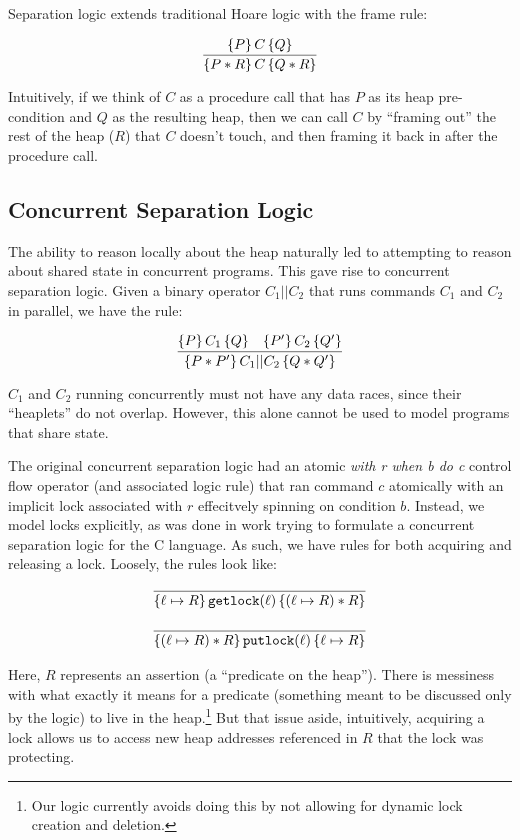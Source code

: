Separation logic extends traditional Hoare logic\cite{hoare1969axiomatic} with
the frame rule:

\[
\infer{\hoaretrip{P * R}{C}{Q * R}}{\hoaretrip{P}{C}{Q}}
\]

Intuitively, if we think of $C$ as a procedure call that has $P$ as its heap
pre-condition and $Q$ as the resulting heap, then we can call $C$ by ``framing
out'' the rest of the heap ($R$) that $C$ doesn't touch, and then framing it
back in after the procedure call.

\subsection{Concurrent Separation Logic}

The ability to reason locally about the heap naturally led to attempting to
reason about shared state in concurrent programs. This gave rise to concurrent
separation logic\cite{o2007resources}. Given a binary operator $C_1 || C_2$ that
runs commands $C_1$ and $C_2$ in parallel, we have the rule:

\[
    \infer{\hoaretrip{P * P'}{C_1 || C_2}{Q * Q'}}{\hoaretrip{P}{C_1}{Q} &
						   \hoaretrip{P'}{C_2}{Q'}}
\]

$C_1$ and $C_2$ running concurrently must not have any data races, since their
``heaplets'' do not overlap. However, this alone cannot be used to model
programs that share state.

The original concurrent separation logic had an atomic \textit{with r when b do
c} control flow operator (and associated logic rule) that ran command $c$
atomically with an implicit lock associated with $r$ effecitvely spinning on
condition $b$. Instead, we model locks explicitly, as was done in work trying
to formulate a concurrent separation logic for the C
language.\cite{hobor2008oracle} As such, we have rules for both acquiring and
releasing a lock. Loosely, the rules look like:

\begin{align*}
    \infer{\hoaretrip{\ell \mapsto R}{\texttt{getlock}(\ell)}{(\ell \mapsto R) *
    R}}{} \\[+9px]
    \infer{\hoaretrip{(\ell \mapsto R) * R}{\texttt{putlock}(\ell)}{\ell \mapsto R}}{}
\end{align*}

Here, $R$ represents an assertion (a ``predicate on the heap''). There is
messiness with what exactly it means for a predicate (something meant to be
discussed only by the logic) to live in the heap.\footnote{Our logic currently
avoids doing this by not allowing for dynamic lock creation and deletion.} But
that issue aside, intuitively, acquiring a lock allows us to access new heap
addresses referenced in $R$ that the lock was protecting.

